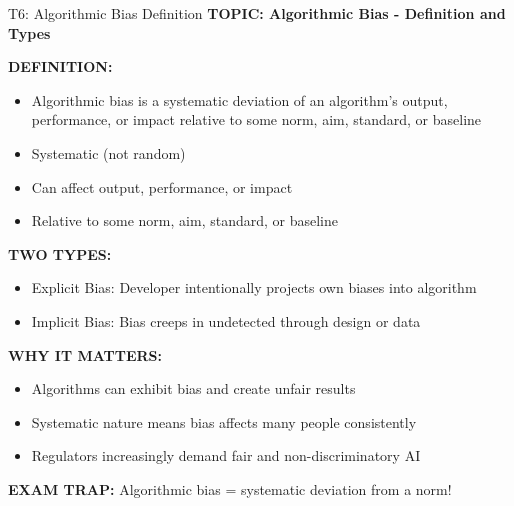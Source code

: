 \documentclass[8pt]{beamer}
\begin{document}
	\begin{frame}{T6: Algorithmic Bias Definition}
		\fontsize{6.5}{7.5}\selectfont
		\textbf{TOPIC: Algorithmic Bias - Definition and Types}
		
		\vspace{0.1cm}
		\textbf{DEFINITION:}
		\begin{itemize}
			\item Algorithmic bias is a systematic deviation of an algorithm's output, performance, or impact relative to some norm, aim, standard, or baseline
			\item Systematic (not random)
			\item Can affect output, performance, or impact
			\item Relative to some norm, aim, standard, or baseline
		\end{itemize}
		
		\vspace{0.1cm}
		\textbf{TWO TYPES:}
		\begin{itemize}
			\item \textcolor{myblue}{Explicit Bias:} Developer intentionally projects own biases into algorithm
			\item \textcolor{myblue}{Implicit Bias:} Bias creeps in undetected through design or data
		\end{itemize}
		
		\vspace{0.1cm}
		\textbf{WHY IT MATTERS:}
		\begin{itemize}
			\item Algorithms can exhibit bias and create unfair results
			\item Systematic nature means bias affects many people consistently
			\item Regulators increasingly demand fair and non-discriminatory AI
		\end{itemize}
		
		\textcolor{myred}{\textbf{EXAM TRAP:}} Algorithmic bias = \textcolor{myblue}{systematic deviation from a norm}!
	\end{frame}
	
\end{document}
